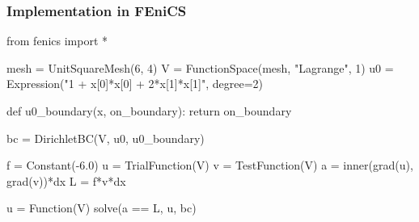 \begin{frame}[fragile]
  \frametitle{Implementation in FEniCS}


  \begin{python}
from fenics import *

mesh = UnitSquareMesh(6, 4)
V = FunctionSpace(mesh, "Lagrange", 1)
u0 = Expression("1 + x[0]*x[0] + 2*x[1]*x[1]", degree=2)

def u0_boundary(x, on_boundary):
    return on_boundary

bc = DirichletBC(V, u0, u0_boundary)

f = Constant(-6.0)
u = TrialFunction(V)
v = TestFunction(V)
a = inner(grad(u), grad(v))*dx
L = f*v*dx

u = Function(V)
solve(a == L, u, bc)
  \end{python}

%
%

\end{frame}

